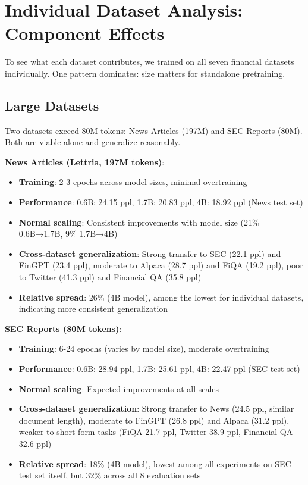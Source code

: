 \section{Individual Dataset Analysis: Component Effects}

To see what each dataset contributes, we trained on all seven financial datasets individually. One pattern dominates: size matters for standalone pretraining.

\subsection{Large Datasets}

Two datasets exceed 80M tokens: News Articles (197M) and SEC Reports (80M). Both are viable alone and generalize reasonably.

\textbf{News Articles (Lettria, 197M tokens)}:
\begin{itemize}
\item \textbf{Training}: 2-3 epochs across model sizes, minimal overtraining
\item \textbf{Performance}: 0.6B: 24.15 ppl, 1.7B: 20.83 ppl, 4B: 18.92 ppl (News test set)
\item \textbf{Normal scaling}: Consistent improvements with model size (21\% 0.6B→1.7B, 9\% 1.7B→4B)
\item \textbf{Cross-dataset generalization}: Strong transfer to SEC (22.1 ppl) and FinGPT (23.4 ppl), moderate to Alpaca (28.7 ppl) and FiQA (19.2 ppl), poor to Twitter (41.3 ppl) and Financial QA (35.8 ppl)
\item \textbf{Relative spread}: 26\% (4B model), among the lowest for individual datasets, indicating more consistent generalization
\end{itemize}

\textbf{SEC Reports (80M tokens)}:
\begin{itemize}
\item \textbf{Training}: 6-24 epochs (varies by model size), moderate overtraining
\item \textbf{Performance}: 0.6B: 28.94 ppl, 1.7B: 25.61 ppl, 4B: 22.47 ppl (SEC test set)
\item \textbf{Normal scaling}: Expected improvements at all scales
\item \textbf{Cross-dataset generalization}: Strong transfer to News (24.5 ppl, similar document length), moderate to FinGPT (26.8 ppl) and Alpaca (31.2 ppl), weaker to short-form tasks (FiQA 21.7 ppl, Twitter 38.9 ppl, Financial QA 32.6 ppl)
\item \textbf{Relative spread}: 18\% (4B model), lowest among all experiments on SEC test set itself, but 32\% across all 8 evaluation sets
\end{itemize}

